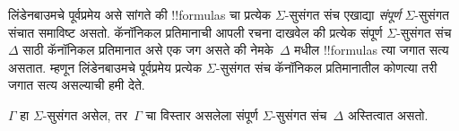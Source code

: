 \documentclass[../../../include/open-logic-section]{subfiles}
\begin{document}


लिंडेनबाउमचे पूर्वप्रमेय असे सांगते की !!{formula}s चा प्रत्येक
$\Sigma$-सुसंगत संच एखाद्या \emph{संपूर्ण} $\Sigma$-सुसंगत
संचात समाविष्ट असतो. कॅनॉनिकल प्रतिमानाची आपली रचना दाखवेल की
प्रत्येक संपूर्ण $\Sigma$-सुसंगत संच~$\Delta$ साठी कॅनॉनिकल
प्रतिमानात असे एक जग असते की नेमके~$\Delta$ मधील
!!{formula}s त्या जगात सत्य असतात. म्हणून लिंडेनबाउमचे पूर्वप्रमेय
प्रत्येक $\Sigma$-सुसंगत संच कॅनॉनिकल प्रतिमानातील कोणत्या तरी
जगात सत्य असल्याची हमी देते.

\begin{thm}[लिंडेनबाउमचे पूर्वप्रमेय]
  $\Gamma$ हा $\Sigma$-सुसंगत असेल, तर~$\Gamma$ चा विस्तार असलेला
  संपूर्ण $\Sigma$-सुसंगत संच~$\Delta$ अस्तित्वात असतो.
\end{thm}
\end{document}
